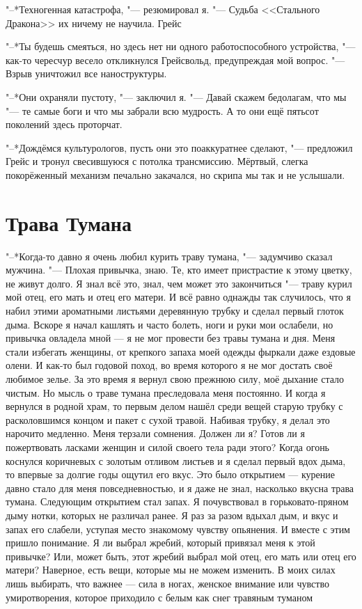 \documentclass[a4paper,10pt]{book}
\newcommand{\ldotst}{\so{...}\xspace}
\begin{document}
"--*Техногенная катастрофа, "--- резюмировал я. "--- Судьба <<Стального 
Дракона>> их ничему не научила. Грейс\ldotst

"--*Ты будешь смеяться, но здесь нет ни одного работоспособного устройства, 
"--- как-то чересчур весело откликнулся Грейсвольд, предупреждая мой вопрос. 
"--- Взрыв уничтожил все наноструктуры.

"--*Они охраняли пустоту, "--- заключил я. "--- Давай скажем бедолагам, что мы 
"--- те самые боги и что мы забрали всю мудрость. А то они ещё пятьсот 
поколений здесь проторчат.

"--*Дождёмся культурологов, пусть они это поаккуратнее сделают, "--- предложил 
Грейс и тронул свесившуюся с потолка трансмиссию. Мёртвый, слегка покорёженный 
механизм печально закачался, но скрипа мы так и не услышали.

\section{Трава Тумана}

"--*Когда-то давно я очень любил курить траву тумана, "--- задумчиво сказал 
мужчина. "--- Плохая привычка, знаю. Те, кто имеет пристрастие к этому цветку, 
не живут долго. Я знал всё это, знал, чем может это закончиться "--- траву 
курил мой отец, его мать и отец его матери. И всё равно однажды так случилось, 
что я набил этими ароматными листьями деревянную трубку и сделал первый глоток 
дыма. Вскоре я начал кашлять и часто болеть, ноги и руки мои ослабели, но 
привычка овладела мной — я не мог провести без травы тумана и дня. Меня стали 
избегать женщины, от крепкого запаха моей одежды фыркали даже ездовые олени. 
И как-то был годовой поход, во время которого я не мог достать своё любимое 
зелье. За это время я вернул свою прежнюю силу, моё дыхание стало чистым. Но 
мысль о траве тумана преследовала меня постоянно. И когда я вернулся в родной 
храм, то первым делом нашёл среди вещей старую трубку с расколовшимся концом и 
пакет с сухой травой.
Набивая трубку, я делал это нарочито медленно. Меня терзали сомнения. Должен ли 
я? Готов ли я пожертвовать ласками женщин и силой своего тела ради этого?
Когда огонь коснулся коричневых с золотым отливом листьев и я сделал первый 
вдох дыма, то впервые за долгие годы ощутил его вкус. Это было открытием — 
курение давно стало для меня повседневностью, и я даже не знал, насколько 
вкусна трава тумана. Следующим открытием стал запах. Я почувствовал в 
горьковато-пряном дыму нотки, которых не различал ранее.
Я раз за разом вдыхал дым, и вкус и запах его слабели, уступая место знакомому 
чувству опьянения. И вместе с этим пришло понимание. Я ли выбрал жребий, 
который привязал меня к этой привычке? Или, может быть, этот жребий выбрал мой 
отец, его мать или отец его матери? Наверное, есть вещи, которые мы не можем 
изменить. В моих силах лишь выбирать, что важнее — сила в ногах, женское 
внимание или чувство умиротворения, которое приходило с белым как снег травяным 
туманом\ldotst
\end{document}
